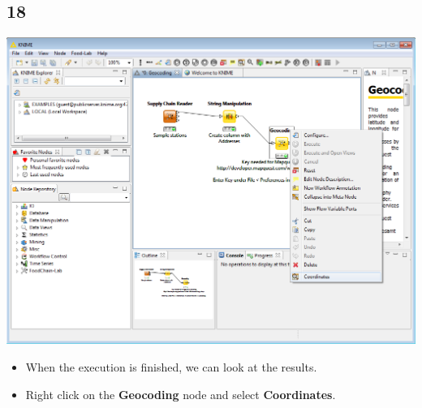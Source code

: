 \documentclass{beamer}
\begin{document}
\subsection{18}
\begin{frame}
	\begin{center}
  		\includegraphics[height=0.6\textheight]{18.png}
	\end{center}
	\begin{itemize}
		\item When the execution is finished, we can look at the results.
		\item Right click on the \textbf{Geocoding} node and select \textbf{Coordinates}.
	\end{itemize}
\end{frame}
\end{document}
